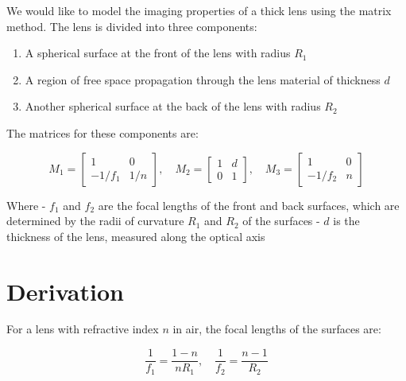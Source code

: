 \documentclass[
  a4paper,
]{book}
\providecommand{\tightlist}{%
  \setlength{\itemsep}{0pt}\setlength{\parskip}{0pt}}
\begin{document}
\begin{tcolorbox}[enhanced jigsaw, coltitle=black, title=\textcolor{quarto-callout-note-color}{\faInfo}\hspace{0.5em}{Thick Lens Focal Length}, colframe=quarto-callout-note-color-frame, toprule=.15mm, opacitybacktitle=0.6, left=2mm, opacityback=0, breakable, toptitle=1mm, bottomtitle=1mm, leftrule=.75mm, arc=.35mm, titlerule=0mm, colbacktitle=quarto-callout-note-color!10!white, rightrule=.15mm, bottomrule=.15mm, colback=white]

We would like to model the imaging properties of a thick lens using the
matrix method. The lens is divided into three components:

\begin{enumerate}
\def\labelenumi{\arabic{enumi}.}
\tightlist
\item
  A spherical surface at the front of the lens with radius \(R_1\)
\item
  A region of free space propagation through the lens material of
  thickness \(d\)
\item
  Another spherical surface at the back of the lens with radius \(R_2\)
\end{enumerate}

The matrices for these components are:

\[
M_1 = \begin{bmatrix} 1 & 0 \\ -1/f_1 & 1/n \end{bmatrix}, \quad
M_2 = \begin{bmatrix} 1 & d \\ 0 & 1 \end{bmatrix}, \quad
M_3 = \begin{bmatrix} 1 & 0 \\ -1/f_2 & n \end{bmatrix}
\]

Where - \(f_1\) and \(f_2\) are the focal lengths of the front and back
surfaces, which are determined by the radii of curvature \(R_1\) and
\(R_2\) of the surfaces - \(d\) is the thickness of the lens, measured
along the optical axis

\section{Derivation}\label{derivation}

For a lens with refractive index \(n\) in air, the focal lengths of the
surfaces are:

\[\frac{1}{f_1} = \frac{1-n}{nR_1}, \quad \frac{1}{f_2} = \frac{n-1}{R_2}\]


\end{tcolorbox}
\end{document}
